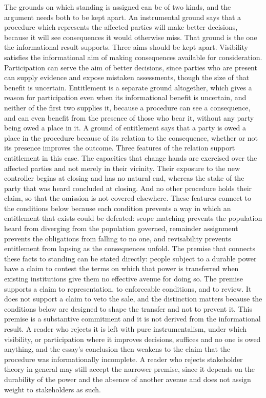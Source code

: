 \documentclass[11pt]{article}
\theoremstyle{definition}
\begin{document}
The grounds on which standing is assigned can be of two kinds, and the argument needs both to be kept apart. An instrumental ground says that a procedure which represents the affected parties will make better decisions, because it will see consequences it would otherwise miss. That ground is the one the informational result supports. Three aims should be kept apart. Visibility satisfies the informational aim of making consequences available for consideration. Participation can serve the aim of better decisions, since parties who are present can supply evidence and expose mistaken assessments, though the size of that benefit is uncertain. Entitlement is a separate ground altogether, which gives a reason for participation even when its informational benefit is uncertain, and neither of the first two supplies it, because a procedure can see a consequence, and can even benefit from the presence of those who bear it, without any party being owed a place in it. A ground of entitlement says that a party is owed a place in the procedure because of its relation to the consequence, whether or not its presence improves the outcome. Three features of the relation support entitlement in this case. The capacities that change hands are exercised over the affected parties and not merely in their vicinity. Their exposure to the new controller begins at closing and has no natural end, whereas the stake of the party that was heard concluded at closing. And no other procedure holds their claim, so that the omission is not covered elsewhere. These features connect to the conditions below because each condition prevents a way in which an entitlement that exists could be defeated: scope matching prevents the population heard from diverging from the population governed, remainder assignment prevents the obligations from falling to no one, and revisability prevents entitlement from lapsing as the consequences unfold. The premise that connects these facts to standing can be stated directly: people subject to a durable power have a claim to contest the terms on which that power is transferred when existing institutions give them no effective avenue for doing so. The premise supports a claim to representation, to enforceable conditions, and to review. It does not support a claim to veto the sale, and the distinction matters because the conditions below are designed to shape the transfer and not to prevent it. This premise is a substantive commitment and it is not derived from the informational result. A reader who rejects it is left with pure instrumentalism, under which visibility, or participation where it improves decisions, suffices and no one is owed anything, and the essay's conclusion then weakens to the claim that the procedure was informationally incomplete. A reader who rejects stakeholder theory in general may still accept the narrower premise, since it depends on the durability of the power and the absence of another avenue and does not assign weight to stakeholders as such.
\end{document}
